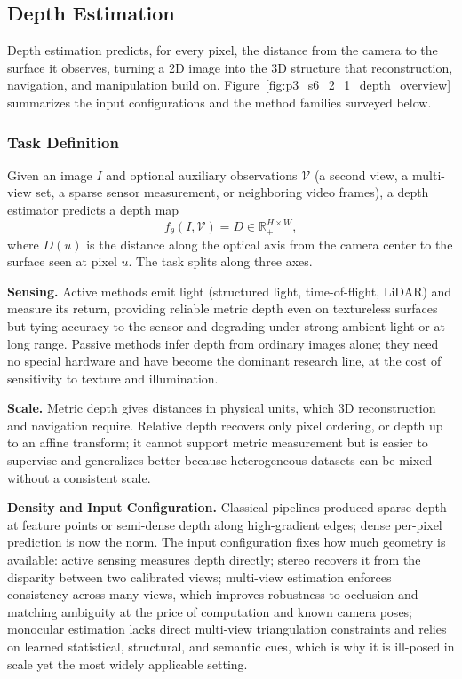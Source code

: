 \subsection{Depth Estimation}
\label{sec:depth_estimation}
Depth estimation predicts, for every pixel, the distance from the camera to the surface it observes, turning a 2D image into the 3D structure that reconstruction, navigation, and manipulation build on. Figure~\ref{fig:p3_s6_2_1_depth_overview} summarizes the input configurations and the method families surveyed below.

\subsubsection{Task Definition}
Given an image $I$ and optional auxiliary observations $\mathcal{V}$ (a second view, a multi-view set, a sparse sensor measurement, or neighboring video frames), a depth estimator predicts a depth map
\begin{equation}
f_\theta(I,\mathcal{V}) = D \in \mathbb{R}_{+}^{H\times W},
\end{equation}
where $D(u)$ is the distance along the optical axis from the camera center to the surface seen at pixel $u$. The task splits along three axes.

\textbf{Sensing.} Active methods emit light (structured light, time-of-flight, LiDAR) and measure its return, providing reliable metric depth even on textureless surfaces but tying accuracy to the sensor and degrading under strong ambient light or at long range. Passive methods infer depth from ordinary images alone; they need no special hardware and have become the dominant research line, at the cost of sensitivity to texture and illumination.

\textbf{Scale.} Metric depth gives distances in physical units, which 3D reconstruction and navigation require. Relative depth recovers only pixel ordering, or depth up to an affine transform; it cannot support metric measurement but is easier to supervise and generalizes better because heterogeneous datasets can be mixed without a consistent scale.

\textbf{Density and Input Configuration.} Classical pipelines produced sparse depth at feature points or semi-dense depth along high-gradient edges; dense per-pixel prediction is now the norm. The input configuration fixes how much geometry is available: active sensing measures depth directly; stereo recovers it from the disparity between two calibrated views; multi-view estimation enforces consistency across many views, which improves robustness to occlusion and matching ambiguity at the price of computation and known camera poses; monocular estimation lacks direct multi-view triangulation constraints and relies on learned statistical, structural, and semantic cues, which is why it is ill-posed in scale yet the most widely applicable setting.

